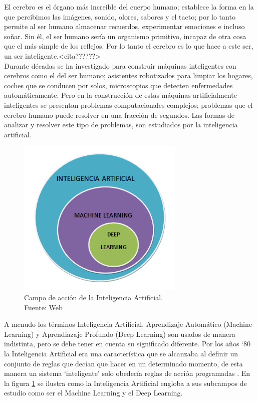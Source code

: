 El cerebro es el órgano más increible del cuerpo humano; establece la forma en la que percibimos las imágenes, sonido, olores, sabores y el tacto; por lo tanto permite al ser humano almacenar recuerdos, experimentar emociones e incluso soñar. Sin él, el ser humano sería un organismo primitivo, incapaz de otra cosa que el más simple de los reflejos. Por lo tanto el cerebro es lo que hace a este ser, un ser inteligente.<cita??????>\\

Durante décadas se ha investigado para construir máquinas inteligentes con cerebros como el del ser humano; asistentes robotizados para limpiar los hogares, coches que se conducen por solos, microscopios que detecten enfermedades automáticamente. Pero en la construcción de estas máquinas artificialmente inteligentes se presentan problemas computacionales complejos; problemas que el cerebro humano puede resolver en una fracción de segundos. Las formas de analizar y resolver este tipo de problemas, son estudiados por la inteligencia artificial.

\begin{figure}[H]
    \begin{center}
        \includegraphics[width=8cm]{img/capitulo_2/ia.png}
    \end{center}
    \caption{Campo de acción de la Inteligencia Artificial.\\Fuente: Web}
    \label{fig:ia}
\end{figure}

A menudo los términos Inteligencia Artificial, Aprendizaje Automático (Machine Learning) y Aprendiazaje Profundo (Deep Learning) son usados de manera indistinta, pero se debe tener en cuenta su significado diferente. Por los años `80 la Inteligencia Artificial era una característica que se alcanzaba al definir un conjunto de reglas que decían que hacer en un determinado momento, de esta manera un sistema `inteligente' solo obedecía reglas de acción programadas \cite{researchgate:ia}. En la figura \ref{fig:ia} se ilustra como la Inteligencia Artificial engloba a sus subcampos de estudio como ser el Machine Learning y el Deep Learning.

